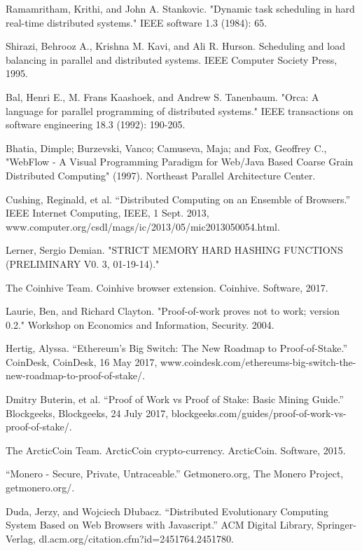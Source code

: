 \documentclass[10pt, conference, compsocconf]{IEEEtran}
\begin{document}
\begin{thebibliography}{1}
Ramamritham, Krithi, and John A. Stankovic. "Dynamic task scheduling in hard real-time distributed systems." IEEE software 1.3 (1984): 65.

Shirazi, Behrooz A., Krishna M. Kavi, and Ali R. Hurson. Scheduling and load balancing in parallel and distributed systems. IEEE Computer Society Press, 1995.

Bal, Henri E., M. Frans Kaashoek, and Andrew S. Tanenbaum. "Orca: A language for parallel programming of distributed systems." IEEE transactions on software engineering 18.3 (1992): 190-205.

Bhatia, Dimple; Burzevski, Vanco; Camuseva, Maja; and Fox, Geoffrey C., "WebFlow - A Visual Programming Paradigm for Web/Java Based Coarse Grain Distributed Computing" (1997).
Northeast Parallel Architecture Center.

 Cushing, Reginald, et al. “Distributed Computing on an Ensemble of Browsers.” IEEE Internet Computing, IEEE, 1 Sept. 2013, www.computer.org/csdl/mags/ic/2013/05/mic2013050054.html.

 Lerner, Sergio Demian. "STRICT MEMORY HARD HASHING FUNCTIONS (PRELIMINARY V0. 3, 01-19-14)."

The Coinhive Team. Coinhive browser extension. Coinhive. Software, 2017.

Laurie, Ben, and Richard Clayton. "Proof-of-work proves not to work; version 0.2." Workshop on Economics and Information, Security. 2004.

Hertig, Alyssa. “Ethereum's Big Switch: The New Roadmap to Proof-of-Stake.” CoinDesk, CoinDesk, 16 May 2017, www.coindesk.com/ethereums-big-switch-the-new-roadmap-to-proof-of-stake/. 

Dmitry Buterin, et al. “Proof of Work vs Proof of Stake: Basic Mining Guide.” Blockgeeks, Blockgeeks, 24 July 2017, blockgeeks.com/guides/proof-of-work-vs-proof-of-stake/. 

The ArcticCoin Team. ArcticCoin crypto-currency. ArcticCoin. Software, 2015.

 “Monero - Secure, Private, Untraceable.” Getmonero.org, The Monero Project, getmonero.org/.

 Duda, Jerzy, and Wojciech Dłubacz. “Distributed Evolutionary Computing System Based on Web Browsers with Javascript.” ACM Digital Library, Springer-Verlag, dl.acm.org/citation.cfm?id=2451764.2451780.


\end{thebibliography}
\end{document}

